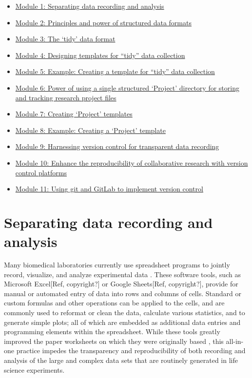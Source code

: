 \documentclass[]{tufte-book}
\providecommand{\tightlist}{%
  \setlength{\itemsep}{0pt}\setlength{\parskip}{0pt}}
\begin{document}
\begin{itemize}
\tightlist
\item
  \protect\hyperlink{module1}{Module 1: Separating data recording and analysis}
\item
  \protect\hyperlink{module2}{Module 2: Principles and power of structured data formats}
\item
  \protect\hyperlink{module3}{Module 3: The `tidy' data format}
\item
  \protect\hyperlink{module4}{Module 4: Designing templates for ``tidy'' data collection}
\item
  \protect\hyperlink{module5}{Module 5: Example: Creating a template for ``tidy'' data collection}
\item
  \protect\hyperlink{module6}{Module 6: Power of using a single structured `Project' directory for storing and tracking research project files}
\item
  \protect\hyperlink{module7}{Module 7: Creating `Project' templates}
\item
  \protect\hyperlink{module8}{Module 8: Example: Creating a `Project' template}
\item
  \protect\hyperlink{module9}{Module 9: Harnessing version control for transparent data recording}
\item
  \protect\hyperlink{module10}{Module 10: Enhance the reproducibility of collaborative research with version control platforms}
\item
  \protect\hyperlink{module11}{Module 11: Using git and GitLab to implement version control}
\end{itemize}

\hypertarget{module1}{%
\section{Separating data recording and analysis}\label{module1}}

Many biomedical laboratories currently use spreadsheet programs to jointly
record, visualize, and analyze experimental data \citep{broman2018data}. These
software tools, such as Microsoft Excel{[}Ref, copyright?{]} or Google Sheets{[}Ref,
copyright?{]}, provide for manual or automated entry of data into rows and columns
of cells. Standard or custom formulas and other operations can be applied to the
cells, and are commonly used to reformat or clean the data, calculate various
statistics, and to generate simple plots; all of which are embedded as
additional data entries and programming elements within the spreadsheet. While
these tools greatly improved the paper worksheets on which they were originally
based \citep{campbell2007number}, this all-in-one practice impedes the transparency
and reproducibility of both recording and analysis of the large and complex data
sets that are routinely generated in life science experiments.
\end{document}
